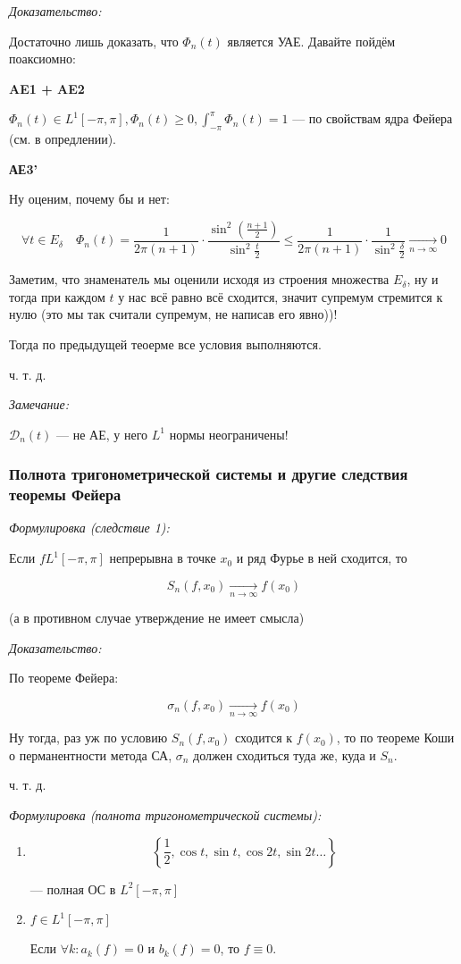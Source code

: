 \documentclass{article}
\def\goesto#1{\underset{#1}{\longrightarrow}}
\def\toinf#1{\goesto{#1 \rightarrow \infty}}
\def\ntoinf{\toinf{n}}
\def\DD{\mathcal{D}}
\begin{document}
\textit{Доказательство:}

Достаточно лишь доказать, что $\Phi_n(t)$ является УАЕ. Давайте пойдём поаксиомно:

\textbf{AE1 + AE2}

$\Phi_n(t) \in L^1[-\pi, \pi], \Phi_n(t) \ge 0, \int_{-\pi}^{\pi} \Phi_n(t) = 1$ --- по свойствам ядра Фейера (см. в опредлении).

\textbf{АЕ3'}

Ну оценим, почему бы и нет: 

\[\forall t \in E_\delta \quad \Phi_n(t) = \frac{1}{2\pi (n + 1)} \cdot \frac{\sin^2\left(\frac{n + 1}{2}\right)}{\sin^2 \frac{t}{2}} \le \frac{1}{2\pi (n + 1)} \cdot \frac{1}{\sin^2 \frac{\delta}{2}} \ntoinf 0\]

Заметим, что знаменатель мы оценили исходя из строения множества $E_\delta$, ну и тогда при каждом $t$ у нас всё равно всё сходится, значит супремум стремится к нулю (это мы так считали супремум, не написав его явно))! 

Тогда по предыдущей теоерме все условия выполняются.

ч. т. д.

\textit{Замечание:}

$\DD_n(t)$ --- не АЕ, у него $L^1$ нормы неограничены!


\subsubsection{Полнота тригонометрической системы и другие следствия теоремы Фейера}
\textit{Формулировка (следствие 1):}

Если $f L^1[-\pi, \pi]$ непрерывна в точке $x_0$ и ряд Фурье в ней сходится, то

\[S_n(f, x_0) \ntoinf f(x_0)\]

(а в противном случае утверждение не имеет смысла)

\textit{Доказательство:}

По теореме Фейера:

\[\sigma_n(f, x_0) \ntoinf f(x_0)\]

Ну тогда, раз уж по условию $S_n(f, x_0)$ сходится к $f(x_0)$, то по теореме Коши о перманентности метода СА, $\sigma_n$ должен сходиться туда же, куда и $S_n$.

ч. т. д. 

\textit{Формулировка (полнота тригонометрической системы):}

\begin{enumerate}
    \item \[\left\{\frac{1}{2}, \cos t, \sin t, \cos 2t, \sin 2t \ldots \right\}\]

    --- полная ОС в $L^2[-\pi, \pi]$
    \item $f \in L^1[-\pi, \pi]$
    
    Если $\forall k: a_k(f) = 0$ и $b_k(f) = 0$, то $f \equiv 0$.
\end{enumerate}
\end{document}
